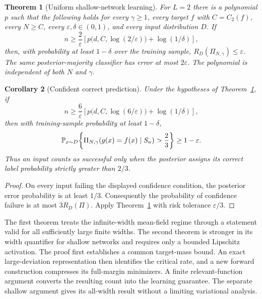 \documentclass[11pt]{article}
\newtheorem{theorem}{Theorem}[section]
\newtheorem{corollary}[theorem]{Corollary}
\theoremstyle{remark}\newtheorem{remark}[theorem]{Remark}
\begin{document}
\begin{theorem}[Uniform shallow-network learning]\label{thm:shallow}
For $L=2$ there is a polynomial $p$ such that the following holds for every
$\gamma\geq1$, every target $f$ with $C=C_2(f)$, every $N\geq C$, every
$\varepsilon,\delta\in(0,1)$, and every input distribution $D$.
If
\[
 n\geq\frac{2}{\varepsilon}
 \left[p\bigl(d,C,\log(2/\varepsilon)\bigr)+\log(1/\delta)\right],
\]
then, with probability at least $1-\delta$ over the training sample,
$R_D(\Pi_{N,\gamma})\leq\varepsilon$.
The same posterior-majority classifier has error at most $2\varepsilon$.
The polynomial is independent of both $N$ and $\gamma$.
\end{theorem}
\begin{corollary}[Confident correct prediction]
Under the hypotheses of Theorem~\ref{thm:shallow}, if
\[
 n\geq\frac{6}{\varepsilon}
 \left[p\bigl(d,C,\log(6/\varepsilon)\bigr)+\log(1/\delta)\right],
\]
then with training-sample probability at least $1-\delta$,
\[
 \mathbb P_{x\sim D}\!\left\{
   \Pi_{N,\gamma}(g(x)=f(x)\mid S_n)>\frac23\right\}
 \geq1-\varepsilon.
\]
Thus an input counts as successful only when the posterior assigns its correct
label probability strictly greater than $2/3$.
\end{corollary}
\begin{proof}
On every input failing the displayed confidence condition, the posterior
error probability is at least $1/3$. Consequently the probability of
confidence failure is at most $3R_D(\Pi)$. Apply
Theorem~\ref{thm:shallow} with risk tolerance $\varepsilon/3$.
\end{proof}
The first theorem treats the infinite-width mean-field regime through a
statement valid for all sufficiently large finite widths. The second theorem
is stronger in its width quantifier for shallow networks and requires only a
bounded Lipschitz activation. The proof first establishes a common target-mass
bound. An exact large-deviation representation then identifies the critical
rate, and a new forward construction compresses its full-margin minimizers.
A finite relevant-function argument converts the resulting count into the
learning guarantee. The separate shallow argument gives its all-width result
without a limiting variational analysis.







\end{document}
